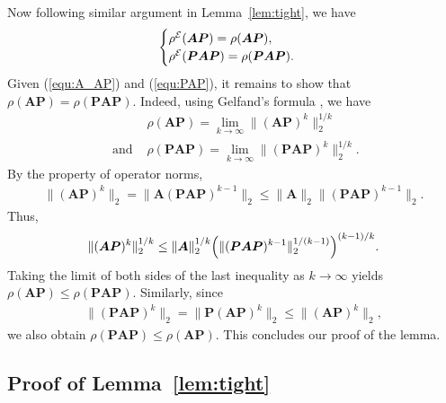 \documentclass{article}
\def\E{{\cal E}}
\newcommand{\norm}[1]{\|#1\|} %
\begin{document}
Now following similar argument in Lemma~\ref{lem:tight}, we have
\begin{align} \label{equ:PAP}
    \begin{cases} \rho^\E(\bm A \bm P) = \rho(\bm A \bm P) , \\
    \rho^\E(\bm P \bm A \bm P) = \rho(\bm P \bm A \bm P) .
    \end{cases}
\end{align}
Given (\ref{equ:A_AP}) and (\ref{equ:PAP}), it remains to show that $\rho(\bm A \bm P) = \rho(\bm P \bm A \bm P)$. Indeed, using Gelfand's formula \cite{gelfand1941normierte}, we have
\begin{align*}
    &\rho(\bm A \bm P) = \lim_{k \to \infty} \norm{(\bm A \bm P)^k}_2^{1/k} \\
    \text{ and } &\rho(\bm P\bm A \bm P) = \lim_{k \to \infty} \norm{(\bm P \bm A \bm P)^k}_2^{1/k} .
\end{align*}
By the property of operator norms,
\begin{align*}
    \norm{(\bm A \bm P)^k}_2 = \norm{\bm A (\bm P \bm A \bm P)^{k-1}}_2 \leq \norm{\bm A}_2 \norm{(\bm P \bm A \bm P)^{k-1}}_2 .
\end{align*}
Thus,
\begin{align*}
    \norm{(\bm A \bm P)^k}_2^{1/k} \leq \norm{\bm A}_2^{1/k} \Bigl(\norm{(\bm P \bm A \bm P)^{k-1}}_2^{1/(k-1)} \Bigr)^{(k-1)/k} .
\end{align*}
Taking the limit of both sides of the last inequality as $k \to \infty$ yields $\rho(\bm A \bm P) \leq \rho(\bm P \bm A \bm P)$.
Similarly, since
\begin{align*}
    \norm{(\bm P \bm A \bm P)^k}_2 = \norm{\bm P (\bm A \bm P)^k}_2 \leq \norm{(\bm A \bm P)^k}_2 ,
\end{align*}
we also obtain $\rho(\bm P \bm A \bm P) \leq \rho(\bm A \bm P)$. This concludes our proof of the lemma.







\subsection{Proof of Lemma~\ref{lem:tight}}
\end{document}
